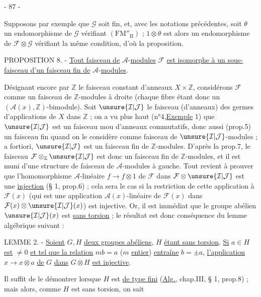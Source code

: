 \begin{center}- 87 -\end{center}
Supposons par exemple que $\mathcal G$ soit fin, et, avec les notations précédentes, soit $\theta$ un endomorphisme de $\mathcal G$ vérifiant $(\mathrm{FM}''_{\mathrm{II}})$ ; $1\otimes\theta$ est alors un endomorphisme de $\mathcal F\otimes\mathcal G$ vérifiant la même condition, d'où la proposition.

PROPOSITION 8. - \uline{Tout faisceau de} $\mathcal A$-\uline{modules} $\mathcal F$ \uline{est isomorphe à un sous-faisceau d'un faisceau fin de} $\mathcal A$-\uline{modules}.

Désignant encore par $\mathbb Z$ le faisceau constant d'anneaux $X\times\mathbb Z$, considérons $\mathcal F$ comme un faisceau de $\mathbb Z$-modules à droite (chaque fibre étant donc un $(\mathcal A(x),\mathbb Z)$-bimodule). Soit $\unsure{\mathcal I|\mathcal J}$ le faisceau (d'anneaux) des germes d'applications de $X$ dans $\mathbb Z$ ; on a vu plus haut (n°4,\uline{Exemple} 1) que $\unsure{\mathcal I|\mathcal J}$ est un faisceau mou d'anneaux commutatifs, donc aussi (prop.5) un faisceau fin quand on le considère comme faisceau de $\unsure{\mathcal I|\mathcal J}$-modules ; a fortiori, $\unsure{\mathcal I|\mathcal J}$ est un faisceau fin de $\mathbb Z$-modules. D'après la prop.7, le faisceau $\mathcal F\otimes_{\mathbb Z}\unsure{\mathcal I|\mathcal J}$ est donc un faisceau fin de $\mathbb Z$-modules, et il est muni d'une structure de faisceau de $\mathcal A$-modules à gauche. Tout revient à prouver que l'homomorphisme $\mathcal A$-linéaire $f\longrightarrow f\otimes1$ de $\mathcal F$ dans $\mathcal F\otimes\unsure{\mathcal I|\mathcal J}$ est une \uline{injection} (§ 1, prop.6) ; cela sera le cas si la restriction de cette application à $\mathcal F(x)$ (qui est une application $\mathcal A(x)$-linéaire de $\mathcal F(x)$ dans $\mathcal F(x)\otimes\unsure{\mathcal I|\mathcal J}(x)$) est injective. Or, il est immédiat que le groupe abélien $\unsure{\mathcal I|\mathcal J}(x)$ est \uline{sans torsion} ; le résultat est donc conséquence du lemme algébrique suivant :

LEMME 2. - \uline{Soient} $G,H$ \uline{deux groupes abéliens}, $H$ \uline{étant sans torsion}. \uline{Si} $a\in H$ \uline{est} $\ne0$ \uline{et tel que la relation} $mb=a$ ($m$ \uline{entier}) \uline{entraîne} $b=\pm a$, \uline{l'application} $x\longrightarrow x\otimes a$ \uline{de} $G$ \uline{dans} $G\otimes H$ \uline{est injective}.

Il suffit de le démontrer lorsque $H$ est \uline{de type fini} (\uline{Alg.}, chap.III, § 1, prop.8) ; mais alors, comme $H$ est sans torsion, on sait

